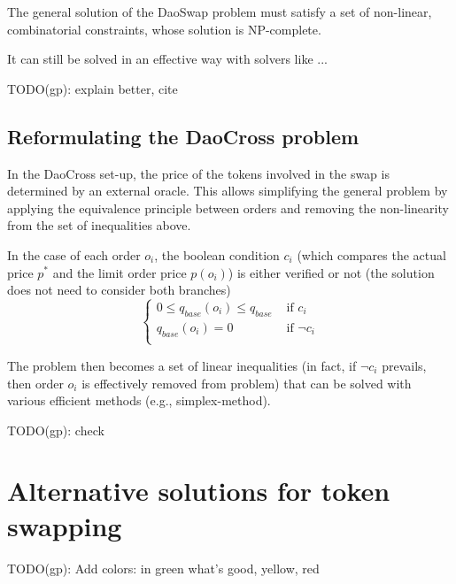 \documentclass[11pt, reqno]{amsart}
\theoremstyle{definition}
\theoremstyle{remark}
\begin{document}
The general solution of the DaoSwap problem must satisfy a set of non-linear,
combinatorial constraints, whose solution is NP-complete.

It can still be solved in an effective way with solvers like ...

TODO(gp): explain better, cite

\subsection{Reformulating the DaoCross problem}
In the DaoCross set-up, the price of the tokens involved in the swap is
determined by an external oracle.
This allows simplifying the general problem by applying the equivalence
principle between orders and removing the non-linearity from the set of
inequalities above.

In the case of each order $o_i$, the boolean condition $c_i$ (which compares
the actual price $p^*$ and the limit order price $p(o_i)$) is either verified
or not (the solution does not need to consider both branches)
\begin{equation}
	\begin{cases}
		0 \le q_{base}(o_i) \le q_{base} & \text{ if } c_i       \\
		q_{base}(o_i) = 0                & \text{ if } \lnot c_i \\
	\end{cases}
\end{equation}

The problem then becomes a set of linear inequalities (in fact, if $\lnot c_i$
prevails, then order $o_i$ is effectively removed from problem) that can be
solved with various efficient methods (e.g., simplex-method).

TODO(gp): check




\section{Alternative solutions for token swapping}

TODO(gp): Add colors: in green what's good, yellow, red
\end{document}
